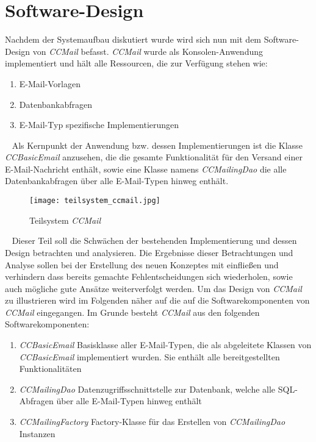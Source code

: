 \section{Software-Design}
\label{sec:ccmail-software-design}
Nachdem der Systemaufbau diskutiert wurde wird sich nun mit dem Software-Design von \emph{CCMail} befasst. \emph{CCMail} wurde als Konsolen-Anwendung implementiert und hält alle Ressourcen, die zur Verfügung stehen wie:
\begin{enumerate}
	\item E-Mail-Vorlagen
	\item Datenbankabfragen
	\item E-Mail-Typ spezifische Implementierungen
\end{enumerate}
\ \newline
Als Kernpunkt der Anwendung bzw. dessen Implementierungen ist die Klasse \emph{CCBasicEmail} anzusehen, die die gesamte Funktionalität für den Versand einer E-Mail-Nachricht enthält, sowie eine Klasse namens \emph{CCMailingDao} die alle Datenbankabfragen über alle E-Mail-Typen hinweg enthält.
\begin{figure}[h]
\centering
\texttt{[image: teilsystem\_ccmail.jpg]} 
\caption{Teilsystem \emph{CCMail}}
\label{fig:ccmail-teilsystem}
\end{figure}
\ \newline
Dieser Teil soll die Schwächen der bestehenden Implementierung und dessen Design betrachten und analysieren. Die Ergebnisse dieser Betrachtungen und Analyse sollen bei der Erstellung des neuen Konzeptes mit einfließen und verhindern dass bereits gemachte Fehlentscheidungen sich wiederholen, sowie auch mögliche gute Ansätze weiterverfolgt werden.
\newline
\newline
Um das Design von \emph{CCMail} zu illustrieren wird im Folgenden näher auf die auf die Softwarekomponenten von \emph{CCMail} eingegangen. Im Grunde besteht \emph{CCMail} aus den folgenden Softwarekomponenten:
\begin{enumerate}
	\item\emph{CCBasicEmail}
	\newline
	Basisklasse aller E-Mail-Typen, die als abgeleitete Klassen von \emph{CCBasicEmail} implementiert wurden. Sie enthält alle bereitgestellten Funktionalitäten
	\item\emph{CCMailingDao}
	\newline
	Datenzugriffsschnittstelle zur Datenbank, welche alle SQL-Abfragen über alle E-Mail-Typen hinweg enthält
	\item\emph{CCMailingFactory}
	\newline
	Factory-Klasse für das Erstellen von \emph{CCMailingDao} Instanzen
\end{enumerate}
\newpage
